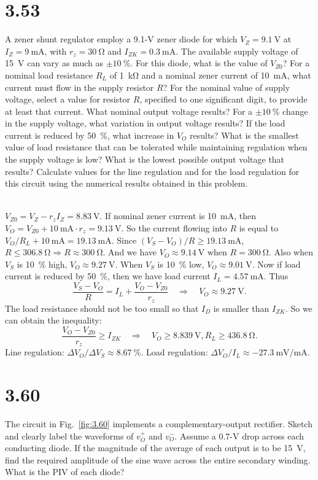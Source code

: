 \documentclass[12pt, a4paper]{article}
\theoremstyle{mystyle}	%
\newcommand{\Ans}{\noindent{\bf Ans:}}
\begin{document}
\section{3.53}
A zener shunt regulator employ a 9.1-\si{\V} zener diode for which
$V_Z = \SI{9.1}{\V}$ at $I_Z = \SI{9}{\mA}$, with $r_z = \SI{30}{\ohm}$
and $I_{ZK}=\SI{0.3}{\mA}$. The available supply voltage of \SI{15}{\V}
can vary as much as $\pm\SI{10}{\percent}$. For this diode, what is the
value of $V_{Z0}$? For a nominal load resistance $R_L$ of \SI{1}{\kohm}
and a nominal zener current of \SI{10}{\mA}, what current must flow
in the supply resistor $R$? For the nominal value of supply voltage,
select a value for resistor $R$, specified to one significant digit,
to provide at least that current. What nominal output voltage results?
For a $\pm\SI{10}{\percent}$ change in the supply voltage, what variation
in output voltage results? If the load current is reduced by
\SI{50}{\percent}, what increase in $V_O$ results? What is the smallest
value of load resistance that can be tolerated while maintaining
regulation when the supply voltage is low? What is the lowest possible
output voltage that results? Calculate values for the line regulation
and for the load regulation for this circuit using the numerical results
obtained in this problem.

\Ans \\
$V_{Z0} = V_Z - r_z I_Z = \SI{8.83}{\V}$. If nominal zener current is
\SI{10}{\mA}, then $V_O = V_{Z0} + \SI{10}{\mA} \cdot r_z = \SI{9.13}{\V}$.
So the current flowing into $R$ is equal to $V_O/R_L + \SI{10}{\mA} =
\SI{19.13}{\mA}$. Since $(V_S - V_O)/R \ge \SI{19.13}{\mA}$,
$R \le \SI{306.8}{\ohm} \Rightarrow R \approx \SI{300}{\ohm}$. And we have
$V_O \approx \SI{9.14}{\V}$ when $R = \SI{300}{\ohm}$. Also when $V_S$ is
\SI{10}{\percent} high, $V_O \approx \SI{9.27}{\V}$. When $V_S$ is
\SI{10}{\percent} low, $V_O \approx \SI{9.01}{\V}$. Now if load current is
reduced by \SI{50}{\percent}, then we have load current
$I_L = \SI{4.57}{\mA}$. Thus
\[ \frac{V_S - V_O}{R} = I_L + \frac{V_O - V_{Z0}}{r_z}
  \quad \Rightarrow \quad V_O \approx \SI{9.27}{\V}. \]
The load resistance should not be too small so that $I_D$ is smaller than
$I_{ZK}$. So we can obtain the inequality:
\[ \frac{V_O - V_{Z0}}{r_z} \ge I_{ZK} \quad \Rightarrow \quad
V_O \ge \SI{8.839}{\V}, R_L \ge \SI{436.8}{\ohm}. \]
Line regulation: $\Delta V_O/ \Delta V_S \approx \SI{8.67}{\percent}$.
Load regulation: $\Delta V_O/I_L \approx \SI{-27.3}{\mV/\mA}$.

\section{3.60}
The circuit in Fig.~\ref{fig:3.60} implements a complementary-output
rectifier. Sketch and clearly label the waveforms of $v_O^+$ and $v_O^-$.
Assume a 0.7-\si{\V} drop across each conducting diode. If the
magnitude of the average of each output is to be \SI{15}{\V}, find
the required amplitude of the sine wave across the entire secondary
winding. What is the PIV of each diode?
\end{document}
